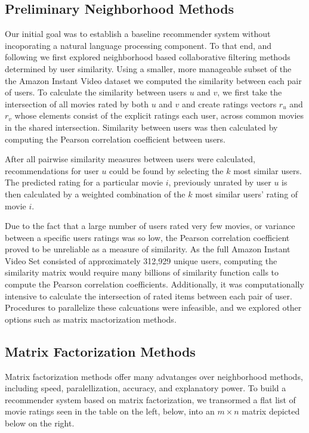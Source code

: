 \documentclass{article} %
\begin{document}
\subsection{Preliminary Neighborhood Methods}
Our initial goal was to establish a baseline recommender system without incoporating a natural language processing component. To that end, and following \cite{WBKNN2013} we first explored neighborhood based collaborative filtering methods determined by user similarity. Using a smaller, more manageable subset of the the Amazon Instant Video dataset we computed the similarity between each pair of users. To calculate the similarity between users $u$ and $v$, we first take the intersection of all movies rated by both $u$ and $v$ and create ratings vectors $r_u$ and $r_v$ whose elements consist of the explicit ratings each user, across common movies in the shared intersection. Similarity between users was then calculated by computing the Pearson correlation coefficient between users. 

After all pairwise similarity measures between users were calculated, recommendations for user $u$ could be found by selecting the $k$ most similar users. The predicted rating for a particular movie $i$, previously unrated by user $u$ is then calculated by a weighted combination of the $k$ most similar users' rating of movie $i$.

Due to the fact that a large number of users rated very few movies, or variance between a specific users ratings was so low, the Pearson correlation coefficient proved to be unreliable as a measure of similarity. As the full Amazon Instant Video Set consisted of approximately 312,929 unique users, computing the similarity matrix would require many billions of similarity function calls to compute the Pearson correlation coefficients. Additionally, it was computationally intensive to calculate the intersection of rated items between each pair of user. Procedures to parallelize these calcuations were infeasible, and we explored other options such as matrix mactorization methods. 

\subsection{Matrix Factorization Methods}
Matrix factorization methods offer many advatanges over neighborhood methods, including speed, paralellization, accuracy, and explanatory power. To build a recommender system based on matrix factorization, we transormed a flat list of movie ratings seen in the table on the left, below, into an $m \times n$ matrix depicted below on the right.
\end{document}
